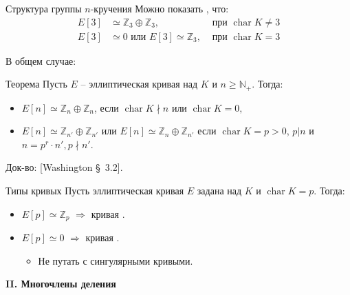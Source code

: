 \documentclass{beamer}
\begin{document}
\begin{frame}{Структура группы $n$-кручения}
Можно показать%
, что:
\begin{align*}
    E[3] &\simeq \mathbb{Z}_3 \oplus \mathbb{Z}_3, & {\text{ при }}\operatorname{char} K \ne 3 \\
    E[3] &\simeq 0 \text{ или } E[3] \simeq \mathbb{Z}_3, & {\text{ при }} \operatorname{char} K = 3
\end{align*}

В общем случае:

\begin{block}{Теорема}
    Пусть $E$ -- эллиптическая кривая над $K$ и $n \geqslant \mathbb{N}_+$. Тогда:
    \begin{itemize}
        \item $E[n] \simeq \mathbb{Z}_n \oplus \mathbb{Z}_n$, если $\operatorname{char} K \nmid n$ или $\operatorname{char} K = 0,$  
        \item $E[n] \simeq \mathbb{Z}_{n'} \oplus \mathbb{Z}_{n'}$ или $E[n] \simeq {\mathbb{Z}_n} \oplus \mathbb{Z}_{n'}$ если $\operatorname{char} K = p > 0$, $p|n$
        и $n = p^r \cdot n', p \nmid n'.$
    \end{itemize}
\end{block}
\ProofBegin
Док-во: [Washington \S~3.2].
\ProofEnd
\end{frame}

\begin{frame}{Типы кривых}
    Пусть эллиптическая кривая $E$ задана над $K$ и $\operatorname{char} K = p$. Тогда:
    \begin{itemize}
        \item $E[p] \simeq \mathbb{Z}_p$ $\Rightarrow$ кривая .
        \item $E[p] \simeq 0$ $\Rightarrow$ кривая .
        \begin{itemize}
            \item[\faExclamationTriangle] Не путать с сингулярными кривыми.
        \end{itemize}
    \end{itemize}
\end{frame}

\begin{frame}
	\begin{center}
		\textcolor{title-and-section-color}{{\LARGE \textbf{II. Многочлены деления}}}
	\end{center}
\end{frame}
\end{document}
